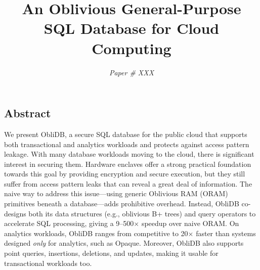 \documentclass[letterpaper,twocolumn,10pt]{article}
\newcommand{\ignore}[1]{}
\def\name/{ObliDB}
\begin{document}
\date{\vspace{-0.9cm}}

\setlength{\droptitle}{-1.1cm}

\title{\Large \bf An Oblivious General-Purpose SQL Database for Cloud Computing\vspace{-0.1cm}}

\author{\emph{Paper \# XXX}}

\ignore{
\author{
{\rm Your N.\ Here}\\
Your Institution
\and
{\rm Second Name}\\
Second Institution
} %
}
\maketitle



\subsection*{Abstract}
We present \name/, a secure SQL database for the public cloud that supports both transactional and analytics workloads and protects against access pattern leakage.
With many database workloads moving to the cloud, there is significant interest in securing them.
Hardware enclaves offer a strong practical foundation towards this goal by providing encryption and secure execution, but they still suffer from access pattern leaks that can reveal a great deal of information.
The naive way to address this issue---using generic Oblivious RAM (ORAM) primitives beneath a database---adds prohibitive overhead.
Instead, \name/ co-designs both its data structures (e.g., oblivious B+ trees) and query operators to accelerate SQL processing, giving a 9--500$\times$ speedup over naive ORAM.
On analytics workloads, \name/ ranges from competitive to 20$\times$ faster than systems designed \emph{only} for analytics, such as Opaque.
Moreover, \name/ also supports point queries, insertions, deletions, and updates, making it usable for transactional workloads too.
\end{document}
